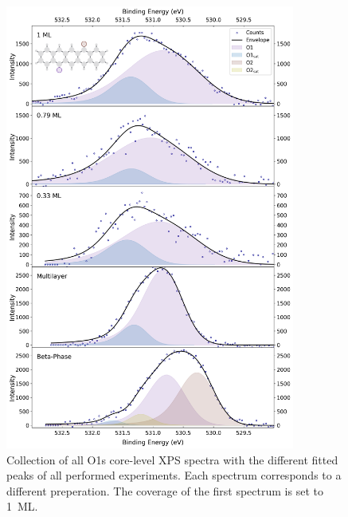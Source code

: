 \begin{figure}[H]
	\centering
	\includegraphics[width=0.85\textwidth]{images/O1s-all.png}
	\caption{Collection of all O1s core-level \ac{XPS} spectra with the different fitted peaks of all performed experiments. Each spectrum corresponds to a different preperation. The coverage of the first spectrum is set to 1~\ac{ML}.}
	\label{fig:O1s-stacked}
\end{figure}

